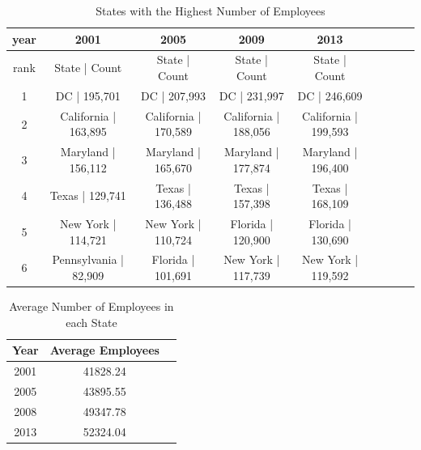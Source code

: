 \documentclass{article}
\begin{document}
            \begin{center}
                \begin{table}
                    \centering
                    \begin{tabular}{ |c|c|c|c|c|c|c|c|c| }
                        \hline
                        year & 2001 & 2005 & 2009 & 2013 \\
                        \hline
                        rank & State | Count & State | Count & State | Count & State | Count \\
                        \hline
                        1 & DC | 195,701 & DC | 207,993 & DC | 231,997 & DC | 246,609 \\
                        2 & California | 163,895 & California | 170,589 & California | 188,056 & California | 199,593 \\
                        3 & Maryland | 156,112 & Maryland | 165,670 & Maryland | 177,874 & Maryland | 196,400 \\
                        4 & Texas | 129,741 & Texas | 136,488 & Texas | 157,398 & Texas | 168,109 \\
                        5 & New York | 114,721 & New York | 110,724 & Florida | 120,900 & Florida | 130,690 \\
                        6 & Pennsylvania | 82,909 & Florida | 101,691 & New York | 117,739 & New York | 119,592 \\
                        \hline
                    \end{tabular}
                    \caption{States with the Highest Number of Employees}
                    \label{tab:6}
                \end{table}
            \end{center}

            \begin{center}
                \begin{table}
                    \centering
                    \begin{tabular}{ |c|c|c| }
                        \hline
                        Year & Average Employees \\
                        \hline
                        2001 & 41828.24 \\
                        2005 & 43895.55 \\
                        2008 & 49347.78 \\
                        2013 & 52324.04 \\
                        \hline
                    \end{tabular}
                    \caption{Average Number of Employees in each State}
                    \label{tab:7}
                \end{table}
            \end{center}
\end{document}
